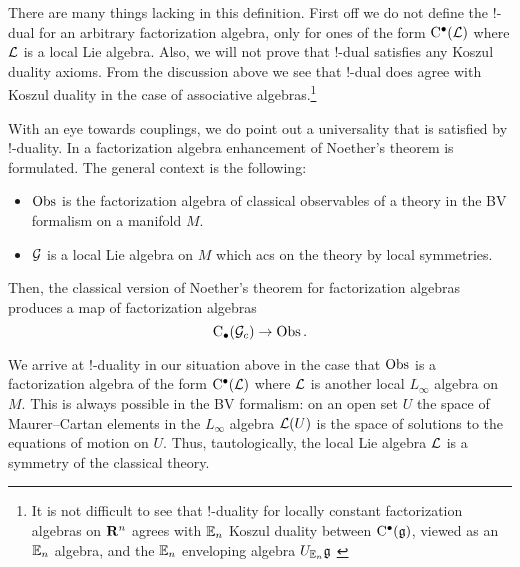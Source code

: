 \documentclass[11pt]{amsart}
\begin{document}
There are many things lacking in this definition. 
First off we do not define the $!$-dual for an arbitrary factorization algebra, only for ones of the form ${\rm C}^\bullet(\mathcal L)$ where $\mathcal L$ is a local Lie algebra. 
Also, we will not prove that $!$-dual satisfies any Koszul duality axioms. 
From the discussion above we see that $!$-dual does agree with Koszul duality in the case of associative algebras.\footnote{It is not difficult to see that $!$-duality for locally constant factorization algebras on $\mathbf{R}^n$ agrees with $\mathbb E_n$ Koszul duality between ${\rm C}^\bullet(\mathfrak g)$, viewed as an $\mathbb E_n$ algebra, and the $\mathbb E_n$ enveloping algebra $U_{\mathbb E_n} \mathfrak g$ \cite{Knudsen, Lurie,...}}

With an eye towards couplings, we do point out a universality that is satisfied by $!$-duality. 
In \cite[Chapter ??]{CG2} a factorization algebra enhancement of Noether's theorem is formulated. 
The general context is the following: 
\begin{itemize}
\item $\operatorname{Obs}$ is the factorization algebra of classical observables of a theory in the BV formalism on a manifold $M$.
\item $\mathcal G$ is a local Lie algebra on $M$ which acs on the theory by local symmetries. 
\end{itemize}
Then, the classical version of Noether's theorem for factorization algebras produces a map of factorization algebras 
\[
{\rm C}_\bullet(\mathcal G_c) \to \operatorname{Obs} .
\]

We arrive at $!$-duality in our situation above in the case that $\operatorname{Obs}$ is a factorization algebra of the form ${\rm C}^\bullet(\mathcal L)$ where $\mathcal L$ is another local $L_\infty$ algebra on $M$. 
This is always possible in the BV formalism: on an open set $U$ the space of Maurer--Cartan elements in the $L_\infty$ algebra $\mathcal L(U)$ is the space of solutions to the equations of motion on $U$.
Thus, tautologically, the local Lie algebra $\mathcal L$ is a symmetry of the classical theory. 
\end{document}
